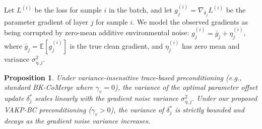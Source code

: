\documentclass{article}
\theoremstyle{plain}
\newtheorem{proposition}[theorem]{Proposition}
\theoremstyle{definition}
\theoremstyle{remark}
\begin{document}
Let $L^{(i)}$ be the loss for sample $i$ in the batch, and let $g_j^{(i)} = \nabla_{\delta_j} L^{(i)}$ be the parameter gradient of layer $j$ for sample $i$. We model the observed gradients as being corrupted by zero-mean additive environmental noise: $g_j^{(i)} = \bar{g}_j + \eta_j^{(i)}$, where $\bar{g}_j = \mathbb{E}[g_j^{(i)}]$ is the true clean gradient, and $\eta_j^{(i)}$ has zero mean and variance $\sigma_{\eta, j}^2$.

\begin{proposition}
Under variance-insensitive trace-based preconditioning (e.g., standard BK-CoMerge where $\gamma_v = 0$), the variance of the optimal parameter offset update $\delta_j^*$ scales linearly with the gradient noise variance $\sigma_{\eta, j}^2$. Under our proposed VAKP-BC preconditioning ($\gamma_v > 0$), the variance of $\delta_j^*$ is strictly bounded and decays as the gradient noise variance increases.
\end{proposition}
\end{document}
